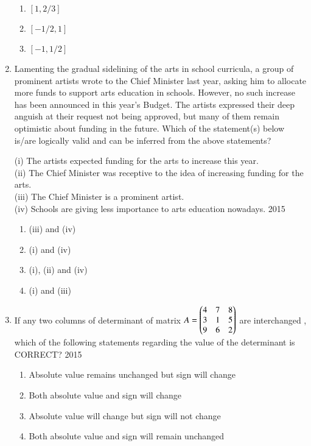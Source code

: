 \documentclass[journal]{IEEEtran}
\begin{document}
\begin{enumerate}
\begin{multicols}{4}
  
  \begin{enumerate}
    \item $[1,2 / 3]$
    \item $[-1 / 2,1]$
    \item  $[-1,1 / 2]$
  \end{enumerate}
  \end{multicols}
  
\item Lamenting the gradual sidelining of the arts in school curricula, a group of prominent artists wrote to the Chief Minister last year, asking him to allocate more funds to support arts education in schools. However, no such increase has been announced in this year's Budget. The artists expressed their deep anguish at their request not being approved, but many of them remain optimistic about funding in the future.
Which of the statement(s) below is/are logically valid and can be inferred from the above statements?

(i) The artists expected funding for the arts to increase this year.\\
(ii) The Chief Minister was receptive to the idea of increasing funding for the arts.\\
(iii) The Chief Minister is a prominent artist.\\
(iv) Schools are giving less importance to arts education nowadays.
\hfill{2015}

			\begin{enumerate}
\item  (iii) and (iv)
\item (i) and (iv)
\item (i), (ii) and (iv)
\item (i) and (iii)
   \end{enumerate}

  \item If any two columns of determinant  of matrix $A =\begin{pmatrix}4 & 7 & 8\\ 3 & 1 & 5\\ 9 & 6 & 2\end{pmatrix}$ are interchanged , which of the following statements regarding the value of the determinant is CORRECT?
  \hfill{2015}
\begin{enumerate}
    \item Absolute value remains unchanged but sign will change
    \item Both absolute value and sign will change
    \item Absolute value will change but sign will not change
    \item Both absolute value and sign will remain unchanged
\end{enumerate}


\end{enumerate}
\end{document}

